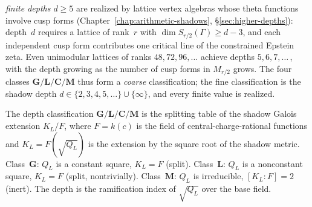 \begin{definition}
\emph{finite depths $d \geq 5$} are realized by lattice vertex
algebras whose theta functions involve cusp forms
(Chapter~\ref{chap:arithmetic-shadows},
\S\ref{sec:higher-depths}): depth~$d$ requires a lattice
of rank~$r$ with $\dim S_{r/2}(\Gamma) \geq d-3$, and
each independent cusp form contributes one critical line
of the constrained Epstein zeta.  Even unimodular lattices
of ranks $48, 72, 96, \dotsc$ achieve depths
$5, 6, 7,\dotsc$\,, with the depth growing as the
number of cusp forms in $M_{r/2}$ grows.  The four classes
$\mathbf{G}/\mathbf{L}/\mathbf{C}/\mathbf{M}$ thus
form a \emph{coarse} classification; the fine classification
is the shadow depth $d \in \{2,3,4,5,\dotsc\} \cup \{\infty\}$,
and every finite value is realized.
\end{definition}

\begin{remark}%
\label{rem:shadow-galois-splitting}%
%
%
The depth classification
$\mathbf{G}/\mathbf{L}/\mathbf{C}/\mathbf{M}$
is the splitting table of the shadow Galois extension
$K_L/F$, where $F = k(c)$ is the field of
central-charge-rational functions and
$K_L = F(\sqrt{Q_L})$ is the extension by the
square root of the shadow metric.
Class~$\mathbf{G}$: $Q_L$ is a constant square,
$K_L = F$ (split).
Class~$\mathbf{L}$: $Q_L$ is a nonconstant square,
$K_L = F$ (split, nontrivially).
Class~$\mathbf{M}$: $Q_L$ is irreducible,
$[K_L : F] = 2$ (inert).
The depth is the ramification index of $\sqrt{Q_L}$ over
the base field.
\end{remark}

